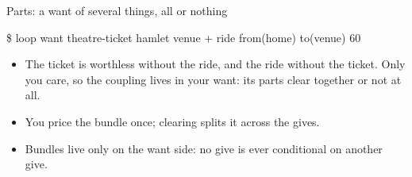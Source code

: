\documentclass[aspectratio=169,11pt]{beamer}
\begin{document}
\begin{frame}{Parts: a want of several things, all or nothing}
  \centering
  \par
  \vspace{4mm}
  \raggedright
  {\scriptsize\ttfamily\color{soft}\$ loop want theatre-ticket hamlet venue + ride \textquotesingle{}from(home)\textquotesingle{} \textquotesingle{}to(venue)\textquotesingle{} 60\par}
  \vspace{3mm}
  \small
  \begin{itemize}\setlength{\itemsep}{1.2mm}
    \item The ticket is worthless without the ride, and the ride without the ticket. Only you care, so the coupling lives in your want: its parts clear together or not at all.
    \item You price the bundle once; clearing splits it across the gives.
    \item Bundles live only on the want side: no give is ever conditional on another give.
  \end{itemize}
\end{frame}
\end{document}
